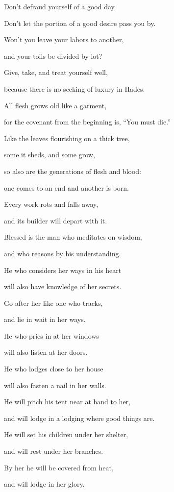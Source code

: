{\par }{\Q {}Don’t defraud yourself of a good day.
\par }{\QB Don’t let the portion of a good desire pass you by.
\par }{\Q {}Won’t you leave your labors to another,
\par }{\QB and your toils be divided by lot?
\par }{\Q {}Give, take, and treat yourself well,
\par }{\QB because there is no seeking of luxury in Hades.
\par }{\Q {}All flesh grows old like a garment,
\par }{\QB for the covenant from the beginning is, “You must die.”
\par }{\Q {}Like the leaves flourishing on a thick tree,
\par }{\QB some it sheds, and some grow,
\par }{\Q so also are the generations of flesh and blood:
\par }{\QB one comes to an end and another is born.
\par }{\Q {}Every work rots and falls away,
\par }{\QB and its builder will depart with it.
\par }{\BB \par }{\Q {}Blessed is the man who meditates on wisdom,
\par }{\QB and who reasons by his understanding.
\par }{\Q {}He who considers her ways in his heart
\par }{\QB will also have knowledge of her secrets.
\par }{\Q {}Go after her like one who tracks,
\par }{\QB and lie in wait in her ways.
\par }{\Q {}He who pries in at her windows
\par }{\QB will also listen at her doors.
\par }{\Q {}He who lodges close to her house
\par }{\QB will also fasten a nail in her walls.
\par }{\Q {}He will pitch his tent near at hand to her,
\par }{\QB and will lodge in a lodging where good things are.
\par }{\Q {}He will set his children under her shelter,
\par }{\QB and will rest under her branches.
\par }{\Q {}By her he will be covered from heat,
\par }{\QB and will lodge in her glory.

}
